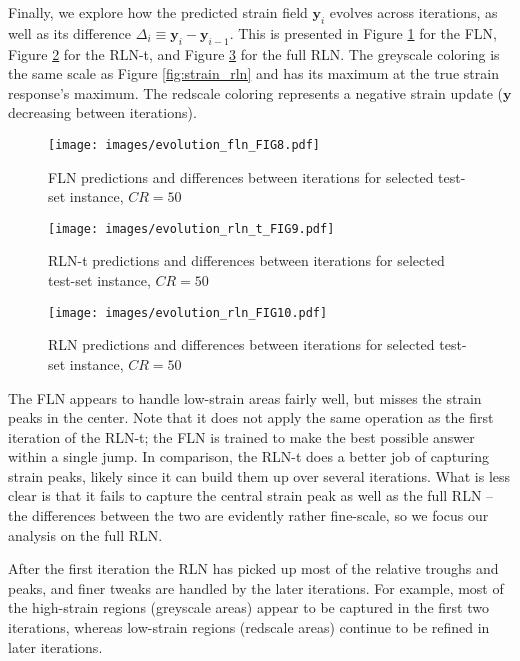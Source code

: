 \documentclass[3p, preprint]{elsarticle}
\newcommand{\bmy}{\bm{y}}
\newenvironment{revision} {} {}
\begin{document}
\begin{revision}

Finally, we explore how the predicted strain field $\bmy_i$ evolves across iterations, as well as its difference $\Delta_i \equiv \bmy_i - \bmy_{i-1}$. This is presented in Figure \ref{fig:evolution_fln}  for the FLN, Figure \ref{fig:evolution_rln_t} for the RLN-t, and Figure \ref{fig:evolution_rln} for the full RLN. The greyscale coloring is the same scale as Figure \ref{fig:strain_rln} and has its maximum at the true strain response's maximum. The redscale coloring represents a negative strain update ($\bmy$ decreasing between iterations). 

\begin{figure}
    \centering
    \texttt{[image: images/evolution\_fln\_FIG8.pdf]}
    \caption{FLN predictions and differences between iterations for selected test-set instance, $CR=50$}
    \label{fig:evolution_fln}
\end{figure} 

\begin{figure}
    \centering
    \texttt{[image: images/evolution\_rln\_t\_FIG9.pdf]}
    \caption{RLN-t predictions and differences between iterations for selected test-set instance, $CR=50$}
    \label{fig:evolution_rln_t}
\end{figure} 

\begin{figure}
    \centering
    \texttt{[image: images/evolution\_rln\_FIG10.pdf]}
    \caption{RLN predictions and differences between iterations for selected test-set instance, $CR=50$}
    \label{fig:evolution_rln}
\end{figure} 


The FLN appears to handle low-strain areas fairly well, but misses the strain peaks in the center. Note that it does not apply the same operation as the first iteration of the RLN-t; the FLN is trained to make the best possible answer within a single jump. In comparison, the RLN-t does a better job of capturing strain peaks, likely since it can build them up over several iterations. What is less clear is that it fails to capture the central strain peak as well as the full RLN -- the differences between the two are evidently rather fine-scale, so we focus our analysis on the full RLN. 
\end{revision}

After the first iteration the RLN has picked up most of the relative troughs and peaks, and finer tweaks are handled by the later iterations. For example, most of the high-strain regions (greyscale areas) appear to be captured in the first two iterations, whereas low-strain regions (redscale areas) continue to be refined in later iterations.
\end{document}
